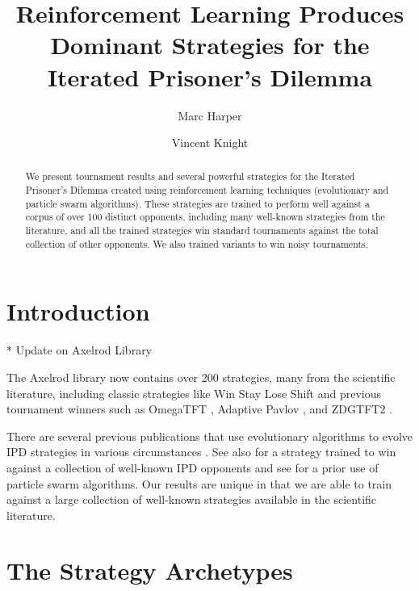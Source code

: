 \documentclass{article}
\title{Reinforcement Learning Produces Dominant Strategies for the
Iterated Prisoner's Dilemma}
\author{Marc Harper \and Vincent Knight} %
\date{}
\begin{document}
\maketitle


\begin{abstract}
    We present tournament results and several powerful strategies for the Iterated
    Prisoner's Dilemma created using reinforcement learning techniques
    (evolutionary and particle swarm algorithms). These strategies are
    trained to perform well against a corpus of over 100 distinct
    opponents, including many well-known strategies from the literature, and all
    the trained strategies win standard tournaments against the total collection
    of other opponents. We also trained variants to win noisy tournaments.
\end{abstract}

\section{Introduction}\label{sec:introduction}

* Update on Axelrod Library


The Axelrod library \cite{knight2016open} now contains over 200 strategies,
many from the scientific literature, including classic strategies like Win Stay
Lose Shift \cite{nowak1993strategy} and previous tournament winners such as
OmegaTFT \cite{slany2007some}, Adaptive Pavlov \cite{li2007design}, and
ZDGTFT2 \cite{stewart2012extortion}.


There are several previous publications that use evolutionary algorithms to
evolve IPD strategies in various circumstances \cite{marks1989niche} \cite{fogel1993evolving} \cite{ashlock2006training}
\cite{ashlock2006changes} \cite{vassiliades2010multiagent} \cite{ashlock2014shaped}
\cite{ashlock2014evolution} \cite{ashlock2015multiple} \cite{barlow2015varying}
\cite{sudo2015effects}. See also \cite{gaudesi2016exploiting} for a strategy
trained to win against a collection of well-known IPD opponents and see
\cite{franken2005particle} for a prior use of particle swarm algorithms. Our
results are unique in that we are able to train against a large collection of
well-known strategies available in the scientific literature.

\section{The Strategy Archetypes}
\end{document}
